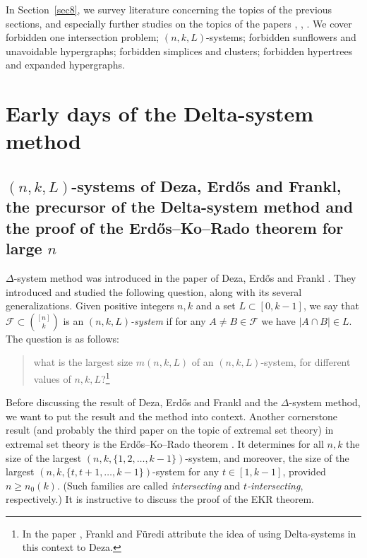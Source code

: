 \documentclass[graybox]{svmult}
\renewcommand{\ge}{\geqslant}
\newcommand{\ff}{\mathcal{F}}
\begin{document}
In Section~\ref{sec8}, we survey literature concerning the topics of the previous sections, and especially further studies on the topics of the papers \cite{DEF}, \cite{FF1}, \cite{FF2}. We cover forbidden one intersection problem; $(n,k,L)$-systems; forbidden sunflowers and unavoidable hypergraphs; forbidden simplices and clusters; forbidden hypertrees and expanded hypergraphs.


\section{Early days of the Delta-system method}\label{sec2}
\subsection{$(n,k,L)$-systems of Deza, Erd\H os and Frankl, the precursor of the Delta-system method and the proof of the Erd\H os--Ko--Rado theorem for large $n$}\label{sec21} $\Delta$-system method was introduced in the paper of Deza, Erd\H os and Frankl \cite{DEF}. They introduced and studied the following question, along with its several generalizations. Given positive integers $n,k$ and a set $L\subset [0,k-1]$, we say that $\ff\subset {[n]\choose k}$ is an {\it $(n,k,L)$-system} if for any $A\ne B\in \ff$ we have $|A\cap B|\in L$. The question is as follows: \begin{quote} what is the largest size $m(n,k,L)$ of an $(n,k,L)$-system, for different values of $n,k, L$?\footnote{In the paper \cite{FF1}, Frankl and F\"uredi attribute  the idea of using Delta-systems in this context to Deza.}\end{quote}
Before discussing the result of Deza, Erd\H os and Frankl and the $\Delta$-system method, we want to put the result and the method into context. Another cornerstone result (and probably the third paper on the topic of extremal set theory) in extremal set theory is the Erd\H os--Ko--Rado theorem \cite{EKR}. It determines for all $n,k$ the size of the largest $(n,k,\{1,2,\ldots, k-1\})$-system, and moreover, the size of the largest  $(n, k, \{t,t+1,\ldots, k-1\})$-system for any $t\in [1,k-1]$, provided $n\ge n_0(k)$. (Such families are called {\it intersecting} and {\it $t$-intersecting}, respectively.) It is instructive to discuss the proof of the EKR theorem.
\end{document}
